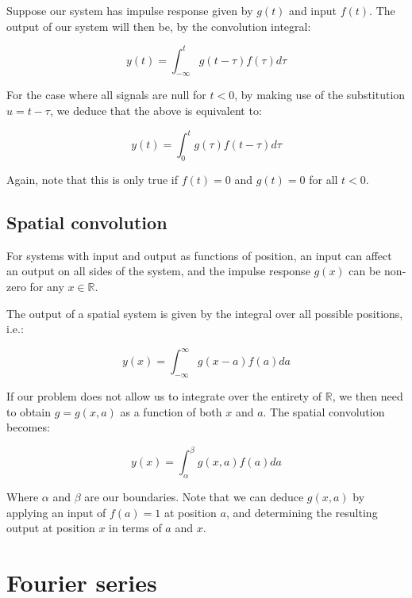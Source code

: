 \documentclass[12pt]{article}
\begin{document}
\begin{proposition}
    Suppose our system has impulse response given by $g(t)$ and input $f(t)$. The output of our system will then be, by the convolution integral:

    \[ y(t) = \int_{-\infty}^t g(t - \tau)f(\tau)d\tau \]

    For the case where all signals are null for $t < 0$, by making use of the substitution $u = t - \tau$, we deduce that the above is equivalent to:

    \[ y(t) = \int_0^t g(\tau)f(t - \tau)d\tau \]

    Again, note that this is only true if $f(t) = 0$ and $g(t) = 0$ for all $t < 0$.
\end{proposition}

\subsection{Spatial convolution}

For systems with input and output as functions of position, an input can affect an output on all sides of the system, and the impulse response $g(x)$ can be non-zero for any $x \in \mathbb{R}$.

\begin{proposition}
    The output of a spatial system is given by the integral over all possible positions, i.e.:

    \[ y(x) = \int_{-\infty}^{\infty} g(x - a)f(a)da \]
\end{proposition}

\begin{proposition}
    If our problem does not allow us to integrate over the entirety of $\mathbb{R}$, we then need to obtain $g = g(x, a)$ as a function of both $x$ and $a$. The spatial convolution becomes:

    \[ y(x) = \int_\alpha^\beta g(x, a)f(a)da \]

    Where $\alpha$ and $\beta$ are our boundaries. Note that we can deduce $g(x, a)$ by applying an input of $f(a) = 1$ at position $a$, and determining the resulting output at position $x$ in terms of $a$ and $x$.
\end{proposition}

\newpage

\section{Fourier series}
\end{document}
